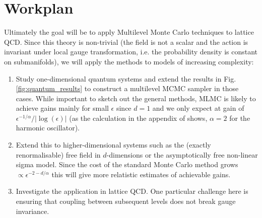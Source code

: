 \documentclass[11pt]{article}
\begin{document}
\section{Workplan}
Ultimately the goal will be to apply Multilevel Monte Carlo techniques to lattice QCD. Since this theory is non-trivial (the field is not a scalar and the action is invariant under local gauge transformation, i.e. the probability density is constant on submanifolds), we will apply the methods to models of increasing complexity:
\begin{enumerate}
\item Study one-dimensional quantum systems and extend the results in Fig. \ref{fig:quantum_results} to construct a multilevel MCMC sampler in those cases. While important to sketch out the general methods, MLMC is likely to achieve gains mainly for small $\epsilon$ since $d=1$ and we only expect at gain of $\epsilon^{-1/\alpha}/|\log(\epsilon)|$ (as the calculation in the appendix of \cite{Creutz1981} shows, $\alpha=2$ for the harmonic oscillator).
\item Extend this to higher-dimensional systems such as the (exactly renormalisable) free field in $d$-dimensions or the asymptotically free non-linear sigma model. Since the cost of the standard Monte Carlo method grows $\propto \epsilon^{-2-d/\alpha}$ this will give more relatistic estimates of achievable gains.
\item Investigate the application in lattice QCD. One particular challenge here is ensuring that coupling between subsequent levels does not break gauge invariance.
\end{enumerate}

{\footnotesize
  
}
\end{document}
